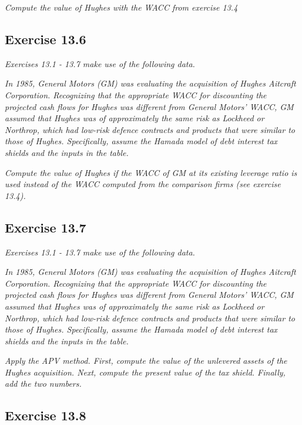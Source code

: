 \documentclass[]{book}
\theoremstyle{definition}
\theoremstyle{definition}
\theoremstyle{remark}
\begin{document}
\emph{Compute the value of Hughes with the WACC from exercise 13.4}
\citep[p.459]{book}

\subsection{Exercise 13.6}\label{exercise-13.6}

\emph{Exercises 13.1 - 13.7 make use of the following data.}
\citep[p.458]{book}

\emph{In 1985, General Motors (GM) was evaluating the acquisition of
Hughes Aitcraft Corporation. Recognizing that the appropriate WACC for
discounting the projected cash flows for Hughes was different from
General Motors' WACC, GM assumed that Hughes was of approximately the
same risk as Lockheed or Northrop, which had low-risk defence contracts
and products that were similar to those of Hughes. Specifically, assume
the Hamada model of debt interest tax shields and the inputs in the
table.} \citep[p.458]{book}

\emph{Compute the value of Hughes if the WACC of GM at its existing
leverage ratio is used instead of the WACC computed from the comparison
firms (see exercise 13.4).} \citep[p.459]{book}

\subsection{Exercise 13.7}\label{exercise-13.7}

\emph{Exercises 13.1 - 13.7 make use of the following data.}
\citep[p.458]{book}

\emph{In 1985, General Motors (GM) was evaluating the acquisition of
Hughes Aitcraft Corporation. Recognizing that the appropriate WACC for
discounting the projected cash flows for Hughes was different from
General Motors' WACC, GM assumed that Hughes was of approximately the
same risk as Lockheed or Northrop, which had low-risk defence contracts
and products that were similar to those of Hughes. Specifically, assume
the Hamada model of debt interest tax shields and the inputs in the
table.} \citep[p.458]{book}

\emph{Apply the APV method. First, compute the value of the unlevered
assets of the Hughes acquisition. Next, compute the present value of the
tax shield. Finally, add the two numbers.} \citep[p.459]{book}

\subsection{Exercise 13.8}\label{exercise-13.8}
\end{document}
